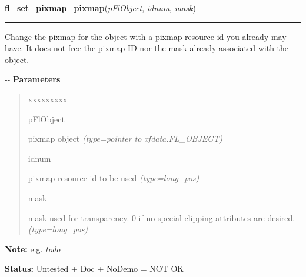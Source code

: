 \hspace{.8\funcindent}\begin{boxedminipage}{\funcwidth}

    \raggedright \textbf{fl\_set\_pixmap\_pixmap}(\textit{pFlObject}, \textit{idnum}, \textit{mask})

    \vspace{-1.5ex}

    \rule{\textwidth}{0.5\fboxrule}
\setlength{\parskip}{2ex}

Change the pixmap for the object with a pixmap resource id you already
may have. It does not free the pixmap ID nor the mask already associated
with the object.

-{}-
\setlength{\parskip}{1ex}
      \textbf{Parameters}
      \vspace{-1ex}

      \begin{quote}
        \begin{Ventry}{xxxxxxxxx}

          \item[pFlObject]


pixmap object
            {\it (type=pointer to xfdata.FL\_OBJECT)}

          \item[idnum]


pixmap resource id to be used
            {\it (type=long\_pos)}

          \item[mask]


mask used for transparency. 0 if no special clipping attributes are
desired.
            {\it (type=long\_pos)}

        \end{Ventry}

      \end{quote}

\textbf{Note:} 
e.g. \emph{todo}


\textbf{Status:} 
Untested + Doc + NoDemo = NOT OK


    \end{boxedminipage}

    \label{xformslib:flbitmap:fl_set_pixmap_pixmap}

    \vspace{0.5ex}

